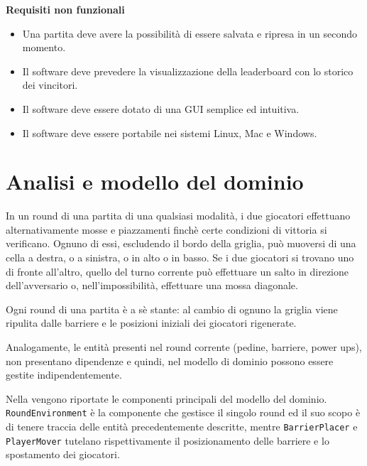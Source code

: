 \documentclass[a4paper,12pt]{report}
\begin{document}
	\textbf{Requisiti non funzionali}
	\begin{itemize}
	\item Una partita deve avere la possibilità di essere salvata e ripresa in un secondo momento.
	\item Il software deve prevedere la visualizzazione della leaderboard con lo storico dei vincitori.
		\item Il software deve essere dotato di una GUI semplice ed intuitiva.
	\item Il software deve essere portabile nei sistemi Linux, Mac e Windows.
	\end{itemize}
	
	\section{Analisi e modello del dominio}
	In un round di una partita di una qualsiasi modalità, i due giocatori effettuano alternativamente mosse e piazzamenti finchè certe condizioni di vittoria si verificano. Ognuno di essi, escludendo il bordo della griglia, può muoversi di una cella a destra, o a sinistra, o in alto o in basso. 
	Se i due giocatori si trovano uno di fronte all'altro, quello del turno corrente può effettuare un salto in direzione dell'avversario o, nell'impossibilità, effettuare una mossa diagonale.
	
	Ogni round di una partita è a sè stante: al cambio di ognuno la griglia viene ripulita dalle barriere e le posizioni iniziali dei giocatori rigenerate. 
	
	Analogamente, le entità presenti nel round corrente (pedine, barriere, power ups), non presentano dipendenze e quindi, nel modello di dominio possono essere gestite indipendentemente.
	
	Nella  vengono riportate le componenti principali del modello del dominio. \texttt{RoundEnvironment} è la componente che gestisce il singolo round ed il suo scopo è di tenere traccia delle entità precedentemente descritte, mentre \texttt{BarrierPlacer} e \texttt{PlayerMover} tutelano rispettivamente il posizionamento delle barriere e lo spostamento dei giocatori. 
	
\end{document}
